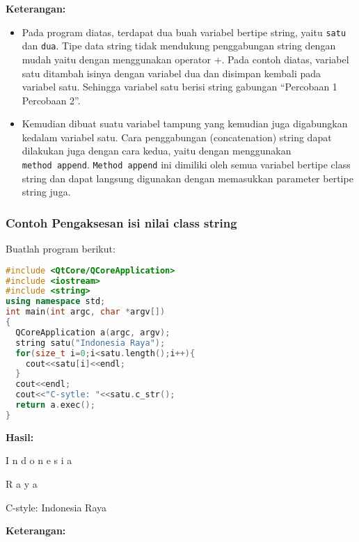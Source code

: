 \textbf{Keterangan:}

\begin{itemize}

\item
  Pada program diatas, terdapat dua buah variabel bertipe string, yaitu
  \texttt{satu} dan \texttt{dua}. Tipe data string tidak mendukung
  penggabungan string dengan mudah yaitu dengan menggunakan operator +.
  Pada contoh diatas, variabel satu ditambah isinya dengan variabel dua
  dan disimpan kembali pada variabel satu. Sehingga variabel satu berisi
  string gabungan ``Percobaan 1 Percobaan 2''.
\item
  Kemudian dibuat suatu variabel tampung yang kemudian juga digabungkan
  kedalam variabel satu. Cara penggabungan (concatenation) string dapat
  dilakukan juga dengan cara kedua, yaitu dengan menggunakan
  \texttt{method\ append}. \texttt{Method\ append} ini dimiliki oleh
  semua variabel bertipe class string dan dapat langsung digunakan
  dengan memasukkan parameter bertipe string juga.
\end{itemize}

\subsubsection*{Contoh  Pengaksesan isi nilai class string}

Buatlah program berikut:

\begin{lstlisting}[language=c++, caption=Pengaksesan isi nilai class string, label=contoh3-27]
#include <QtCore/QCoreApplication>
#include <iostream>
#include <string>
using namespace std;
int main(int argc, char *argv[])
{
  QCoreApplication a(argc, argv);
  string satu("Indonesia Raya");
  for(size_t i=0;i<satu.length();i++){
    cout<<satu[i]<<endl;
  }
  cout<<endl;
  cout<<"C-sytle: "<<satu.c_str();
  return a.exec();
}
\end{lstlisting}

\textbf{Hasil:}

\begin{lcverbatim}
I
n
d
o
n
e
s
i
a


R
a
y
a

C-style: Indonesia Raya
\end{lcverbatim}

\textbf{Keterangan:}

